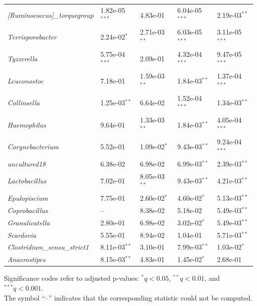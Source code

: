 \begin{table}[H]
\begin{tabular}{lllll}
\addlinespace
\emph{[Ruminococcus]\_torquegroup} & 1.82e-05$^{***}$ & 4.83e-01 & 6.04e-05$^{***}$ & 2.19e-03$^{**}$ \\
\emph{Terrisporobacter} & 2.24e-02$^{*}$ & 2.71e-03$^{**}$ & 6.03e-05$^{***}$ & 3.11e-05$^{***}$ \\
\emph{Tyzzerella} & 5.75e-04$^{***}$ & 2.09e-01 & 4.32e-04$^{***}$ & 9.47e-05$^{***}$ \\
\emph{Leuconostoc} & 7.18e-01 & 1.59e-03$^{**}$ & 1.84e-03$^{**}$ & 1.37e-04$^{***}$ \\
\emph{Collinsella} & 1.25e-03$^{**}$ & 6.64e-02 & 1.52e-04$^{***}$ & 1.34e-03$^{**}$ \\
\addlinespace
\emph{Haemophilus} & 9.64e-01 & 1.33e-03$^{**}$ & 1.84e-03$^{**}$ & 4.05e-04$^{***}$ \\
\emph{Corynebacterium} & 5.52e-01 & 1.09e-02$^{*}$ & 9.43e-03$^{**}$ & 9.24e-04$^{***}$ \\
\emph{uncultured18} & 6.38e-02 & 6.98e-02 & 6.99e-03$^{**}$ & 2.39e-03$^{**}$ \\
\emph{Lactobacillus} & 7.02e-01 & 8.05e-03$^{**}$ & 9.43e-03$^{**}$ & 4.21e-03$^{**}$ \\
\emph{Epulopiscium} & 7.75e-01 & 2.60e-02$^{*}$ & 4.60e-02$^{*}$ & 5.13e-03$^{**}$ \\
\addlinespace
\emph{Coprobacillus} & -- & 8.38e-02 & 5.18e-02 & 5.49e-03$^{**}$ \\
\emph{Granulicatella} & 2.80e-01 & 6.98e-02 & 3.02e-02$^{*}$ & 5.49e-03$^{**}$ \\
\emph{Scardovia} & 5.55e-01 & 8.94e-02 & 1.04e-01 & 5.71e-03$^{**}$ \\
\emph{Clostridium\_sensu\_strict1} & 8.11e-03$^{**}$ & 3.10e-01 & 7.99e-03$^{**}$ & 1.03e-02$^{*}$ \\
\emph{Anaerostipes} & 8.15e-03$^{**}$ & 4.83e-01 & 1.45e-02$^{*}$ & 2.68e-01 \\
\bottomrule
\end{tabular}

\vspace{0.4em}
\begin{minipage}{0.95\textwidth}
\small
Significance codes refer to adjusted p-values: $^{*} q < 0.05$, $^{**} q < 0.01$, and $^{***} q < 0.001$.\\
The symbol ``--'' indicates that the corresponding statistic could not be computed.
\end{minipage}
\end{table}

